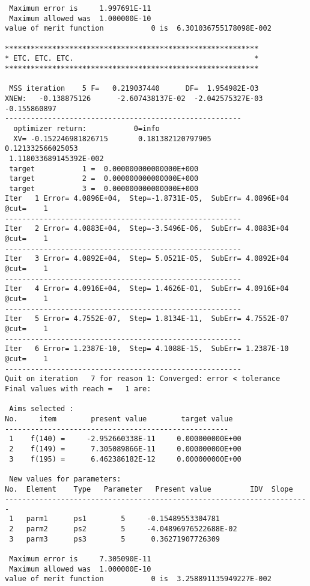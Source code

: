 \begin{footnotesize}
\begin{verbatim}
 Maximum error is     1.997691E-11
 Maximum allowed was  1.000000E-10
value of merit function           0 is  6.301036755178098E-002

***********************************************************
* ETC. ETC. ETC.                                          *
***********************************************************

 MSS iteration    5 F=   0.219037440      DF=  1.954982E-03
XNEW:   -0.138875126      -2.607438137E-02  -2.042575327E-03  -0.155860897
-------------------------------------------------------
  optimizer return:           0=info
  XV= -0.152246981826715       0.181382120797905       0.121332566025053
 1.118033689145392E-002
 target           1 =  0.000000000000000E+000
 target           2 =  0.000000000000000E+000
 target           3 =  0.000000000000000E+000
Iter   1 Error= 4.0896E+04,  Step=-1.8731E-05,  SubErr= 4.0896E+04 @cut=    1
-------------------------------------------------------
Iter   2 Error= 4.0883E+04,  Step=-3.5496E-06,  SubErr= 4.0883E+04 @cut=    1
-------------------------------------------------------
Iter   3 Error= 4.0892E+04,  Step= 5.0521E-05,  SubErr= 4.0892E+04 @cut=    1
-------------------------------------------------------
Iter   4 Error= 4.0916E+04,  Step= 1.4626E-01,  SubErr= 4.0916E+04 @cut=    1
-------------------------------------------------------
Iter   5 Error= 4.7552E-07,  Step= 1.8134E-11,  SubErr= 4.7552E-07 @cut=    1
-------------------------------------------------------
Iter   6 Error= 1.2387E-10,  Step= 4.1088E-15,  SubErr= 1.2387E-10 @cut=    1
-------------------------------------------------------
Quit on iteration   7 for reason 1: Converged: error < tolerance
Final values with reach =   1 are:

 Aims selected :
No.     item        present value        target value
----------------------------------------------------
 1    f(140) =     -2.952660338E-11     0.000000000E+00
 2    f(149) =      7.305089866E-11     0.000000000E+00
 3    f(195) =      6.462386182E-12     0.000000000E+00

 New values for parameters:
No.  Element    Type   Parameter   Present value         IDV  Slope
-----------------------------------------------------------------------
 1   parm1      ps1        5     -0.15489553304781
 2   parm2      ps2        5     -4.04896976522688E-02
 3   parm3      ps3        5      0.36271907726309

 Maximum error is     7.305090E-11
 Maximum allowed was  1.000000E-10
value of merit function           0 is  3.258891135949227E-002


\end{verbatim}
\end{footnotesize}
